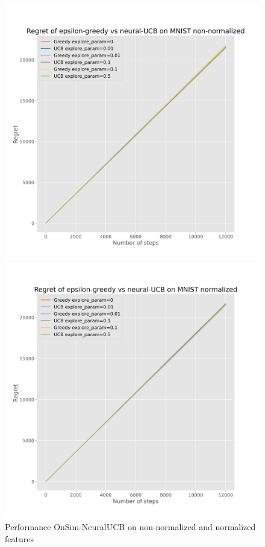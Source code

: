 \documentclass{article}
\begin{document}
\begin{figure}[h]
  \centering
  \begin{minipage}{.45\textwidth}
    \centering
    \includegraphics[width=\linewidth]{online-epsilon-vs-neural-mnist--non-normalized-ci}
  \end{minipage}%
  \begin{minipage}{.45\textwidth}
    \centering
    \includegraphics[width=\linewidth]{online-epsilon-vs-neural-mnist--normalized-ci}
  \end{minipage}
  \caption{Performance OnSim-NeuralUCB on non-normalized and normalized features}\label{fig:online-epsilon-vs-neural-ci-mnist}
\end{figure}
\end{document}
